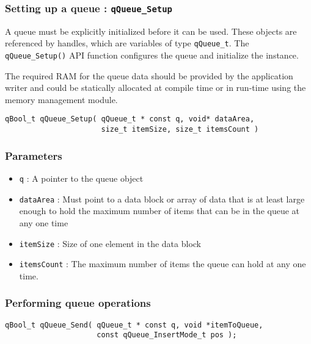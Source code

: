 

\subsubsection{Setting up a queue : \texorpdfstring{\lstinline{qQueue_Setup}}{qQueue_Setup} }  \label{queuecreate}
A queue must be explicitly initialized before it can be used. 
\medskip
These objects are referenced by handles, which are variables of type \lstinline{qQueue_t}. The \lstinline{qQueue_Setup()} API function configures the queue and initialize the instance. 

The required RAM for the queue data should be provided by the application writer and could be statically allocated at compile time or in run-time using the memory management module.
\medskip
 
\begin{lstlisting}[style=CStyle]
qBool_t qQueue_Setup( qQueue_t * const q, void* dataArea, 
                      size_t itemSize, size_t itemsCount )
\end{lstlisting}

\subsubsection*{Parameters}
\begin{itemize}
    \item \lstinline{q} : A pointer to the queue object
    \item \lstinline{dataArea} : Must point to a data block or array of data that is at least large enough to hold the maximum number of items that can be in the queue at any one time
    \item \lstinline{itemSize} : Size of one element in the data block
    \item \lstinline{itemsCount} : The maximum number of items the queue can hold at any one time.
\end{itemize}      
    
\subsubsection{Performing queue operations}
\begin{lstlisting}[style=CStyle]
qBool_t qQueue_Send( qQueue_t * const q, void *itemToQueue,
                     const qQueue_InsertMode_t pos );
\end{lstlisting}

